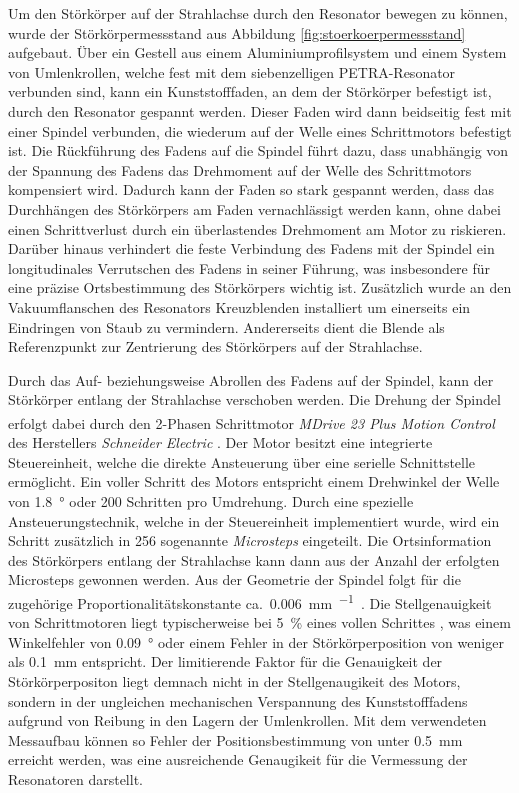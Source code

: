 Um den Störkörper auf der Strahlachse durch den Resonator bewegen zu können, wurde der Störkörpermessstand aus Abbildung \ref{fig:stoerkoerpermessstand} aufgebaut.
Über ein Gestell aus einem Aluminiumprofilsystem und einem System von Umlenkrollen, welche fest mit dem siebenzelligen PETRA-Resonator verbunden sind, kann ein Kunststofffaden, an dem der Störkörper befestigt ist, durch den Resonator gespannt werden.
Dieser Faden wird dann beidseitig fest mit einer Spindel verbunden, die wiederum auf der Welle eines Schrittmotors befestigt ist.
Die Rückführung des Fadens auf die Spindel führt dazu, dass unabhängig von der Spannung des Fadens das Drehmoment auf der Welle des Schrittmotors kompensiert wird.
Dadurch kann der Faden so stark gespannt werden, dass das Durchhängen des Störkörpers am Faden vernachlässigt werden kann, ohne dabei einen Schrittverlust durch ein überlastendes Drehmoment am Motor zu riskieren.
Darüber hinaus verhindert die feste Verbindung des Fadens mit der Spindel ein longitudinales Verrutschen des Fadens in seiner Führung, was insbesondere für eine präzise Ortsbestimmung des Störkörpers wichtig ist.
Zusätzlich wurde an den Vakuumflanschen des Resonators Kreuzblenden installiert um einerseits ein Eindringen von Staub zu vermindern. Andererseits dient die Blende als Referenzpunkt zur Zentrierung des Störkörpers auf der Strahlachse.

Durch das Auf- beziehungsweise Abrollen des Fadens auf der Spindel, kann der Störkörper entlang der Strahlachse verschoben werden.
Die Drehung der Spindel erfolgt dabei durch den 2-Phasen Schrittmotor \textit{MDrive\textsuperscript{\textregistered} 23 Plus Motion Control} des Herstellers \textit{Schneider Electric} \cite{motor_datasheet}.
Der Motor besitzt eine integrierte Steuereinheit, welche die direkte Ansteuerung über eine serielle Schnittstelle ermöglicht.
Ein voller Schritt des Motors entspricht einem Drehwinkel der Welle von \SI{1.8}{\degree} oder \num{200} Schritten pro Umdrehung.
Durch eine spezielle Ansteuerungstechnik, welche in der Steuereinheit implementiert wurde, wird ein Schritt zusätzlich in \num{256} sogenannte \textit{Microsteps} eingeteilt.
Die Ortsinformation des Störkörpers entlang der Strahlachse kann dann aus der Anzahl der erfolgten Microsteps gewonnen werden.
Aus der Geometrie der Spindel folgt für die zugehörige Proportionalitätskonstante ca.\ \SI{0.006}{\milli\metre\per\micro\step}.
Die Stellgenauigkeit von Schrittmotoren liegt typischerweise bei \SI{5}{\percent} eines vollen Schrittes \cite{gecko}, was einem Winkelfehler von \SI{0.09}{\degree} oder einem Fehler in der Störkörperposition von weniger als \SI{0.1}{\milli\metre} entspricht.
Der limitierende Faktor für die Genauigkeit der Störkörperpositon liegt demnach nicht in der Stellgenaugikeit des Motors, sondern in der ungleichen mechanischen Verspannung des Kunststofffadens aufgrund von Reibung in den Lagern der Umlenkrollen.
Mit dem verwendeten Messaufbau können so Fehler der Positionsbestimmung von unter \SI{0.5}{mm} erreicht werden, was eine ausreichende Genaugikeit für die Vermessung der Resonatoren darstellt.

